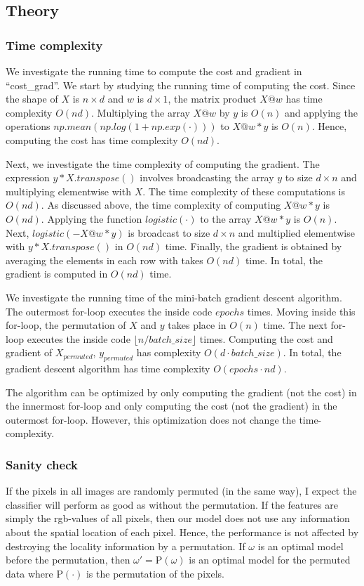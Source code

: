\documentclass{article}
\begin{document}
\subsection*{Theory}
	\subsubsection*{Time complexity}
	We investigate the running time to compute the cost and gradient in ``cost\_grad''.
	We start by studying the running time of computing the cost.
	Since the shape of $X$ is $n\times d$ and $w$ is $d \times 1$, the matrix product $X @ w$ has time complexity $O(nd)$.
	Multiplying the array $X @ w$ by $y$ is $O(n)$ and applying the operations $np.mean(np.log(1 + np.exp(\cdot)))$ to $X @ w * y$ is $O(n)$.
	Hence, computing the cost has time complexity $O(nd)$.

	Next, we investigate the time complexity of computing the gradient.
	The expression $y*X.transpose()$ involves broadcasting the array $y$ to size $d \times n$ and multiplying elementwise with $X$. 
	The time complexity of these computations is $O(nd)$.
	As discussed above, the time complexity of computing $X @ w * y$ is $O(nd)$.
	Applying the function $logistic(\cdot)$ to the array $X @ w * y$ is $O(n)$.
	Next, $logistic(-X @ w * y)$ is broadcast to size $d \times n$ and multiplied elementwise with $y * X.transpose()$ in $O(nd)$ time.
	Finally, the gradient is obtained by averaging the elements in each row with takes $O(nd)$ time.
	In total, the gradient is computed in $O(nd)$ time.
	
	We investigate the running time of the mini-batch gradient descent algorithm.
	The outermost for-loop executes the inside code $epochs$ times.
	Moving inside this for-loop, the permutation of $X$ and $y$ takes place in $O(n)$ time.
	The next for-loop executes the inside code $\lfloor n/batch\_size \rfloor$ times.
	Computing the cost and gradient of $X_{permuted}$, $y_{permuted}$ has complexity $O(d\cdot batch\_size)$.
	In total, the gradient descent algorithm has time complexity $O(epochs\cdot n d)$.
	
	The algorithm can be optimized by only computing the gradient (not the cost) in the innermost for-loop and only computing the cost (not the gradient) in the outermost for-loop. 
	However, this optimization does not change the time-complexity. 
	
	\subsubsection*{Sanity check}
	If the pixels in all images are randomly permuted (in the same way), I expect the classifier will perform as good as without the permutation.
	If the features are simply the rgb-values of all pixels, then our model does not use any information about the spatial location of each pixel. Hence, the performance is not affected by destroying the locality information by a permutation.
	If $\omega$ is an optimal model before the permutation, then $\omega' = \mathrm{P}(\omega)$ is an optimal model for the permuted data where $\mathrm{P}(\cdot)$ is the permutation of the pixels.
	
\end{document}
